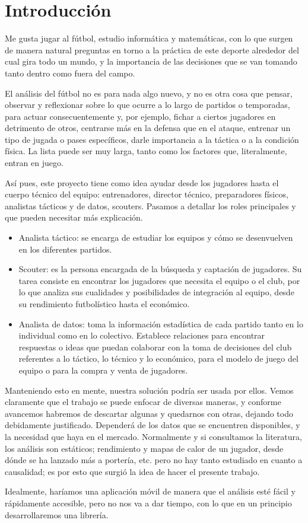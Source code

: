 \chapter{Introducción}
Me gusta jugar al fútbol, estudio informática y matemáticas, con lo que 
surgen de manera natural preguntas en torno a la práctica de este deporte 
alrededor del cual gira todo un mundo, y la importancia de las decisiones 
que se van tomando tanto dentro como fuera del campo.

El análisis del fútbol no es para nada algo nuevo, y no es otra cosa que 
pensar, observar y reflexionar sobre lo que ocurre a lo largo de partidos
o temporadas, para actuar consecuentemente y, por ejemplo, fichar a 
ciertos jugadores en detrimento de otros, centrarse más en la defensa 
que en el ataque, entrenar un tipo de jugada o pases específicos, darle 
importancia a la táctica o a la condición física. La lista puede ser muy 
larga, tanto como los factores que, literalmente, entran en juego.

Así pues, este proyecto tiene como idea ayudar desde los jugadores hasta 
el cuerpo técnico del equipo: entrenadores, director técnico, preparadores 
físicos, analistas tácticos y de datos, scouters. Pasamos a detallar los roles
principales y que pueden necesitar más explicación.
\begin{itemize}
    \item Analista táctico: se encarga de estudiar los equipos y cómo se 
    desenvuelven en los diferentes partidos.
    \item Scouter: es la persona encargada de la búsqueda y captación de 
    jugadores. Su tarea consiste en encontrar los jugadores que necesita 
    el equipo o el club, por lo que analiza sus cualidades y posibilidades 
    de integración al equipo, desde su rendimiento futbolístico hasta el 
    económico.
    \item Analista de datos: toma la información estadística de cada 
    partido tanto en lo individual como en lo colectivo. Establece 
    relaciones para encontrar respuestas o ideas que puedan colaborar con 
    la toma de decisiones del club referentes a lo táctico, lo técnico y 
    lo económico, para el modelo de juego del equipo o para la compra y 
    venta de jugadores.
\end{itemize}

Manteniendo esto en mente, nuestra solución podría ser usada por ellos. 
Vemos claramente que el trabajo se puede enfocar de diversas maneras, 
y conforme avancemos habremos de descartar algunas y quedarnos con otras, 
dejando todo debidamente justificado. Dependerá de los datos que se 
encuentren disponibles, y la necesidad que haya en el mercado. 
Normalmente y si consultamos la literatura, los análisis son estáticos; 
rendimiento y mapas de calor de un jugador, desde dónde se ha lanzado más 
a portería, etc. pero no hay tanto estudiado en cuanto a causalidad; es por 
esto que surgió la idea de hacer el presente trabajo. 

Idealmente, haríamos una aplicación móvil de manera que el análisis esté 
fácil y rápidamente accesible, pero no nos va a dar tiempo, con lo que en 
un principio desarrollaremos una librería.
